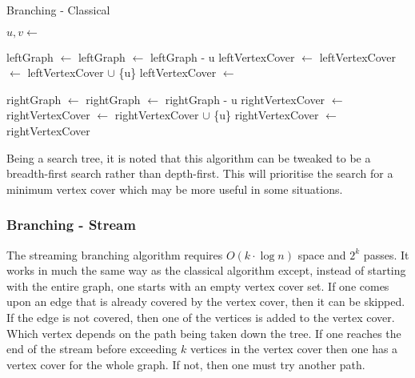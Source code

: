 \begin{algorithm}[htb]
    \caption{Branching - Classical}
    \label{alg:branching_classical}
    \DontPrintSemicolon

    \Func
    {
    }
    {
        $u, v \gets$ \;

        leftGraph $\gets$ \;
        leftGraph $\gets$ leftGraph - u\;
        leftVertexCover $\gets$ \;
        leftVertexCover $\gets$ leftVertexCover $\cup$ \{u\}\;
        leftVertexCover $\gets$ \;

        rightGraph $\gets$ \;
        rightGraph $\gets$ rightGraph - u\;
        rightVertexCover $\gets$ \;
        rightVertexCover $\gets$ rightVertexCover $\cup$ \{u\}\;
        rightVertexCover $\gets$ \;
        \Return rightVertexCover
    }
\end{algorithm}

Being a search tree, it is noted that this algorithm can be tweaked to be a
breadth-first search rather than depth-first. This will prioritise the search
for a minimum vertex cover which may be more useful in some situations.

\subsubsection{Branching - Stream}

The streaming branching algorithm requires \(O(k\cdot \log n)\) space and
\(2^k\) passes. It works in much the same way as the classical algorithm
except, instead of starting with the entire graph, one starts with an empty
vertex cover set. If one comes upon an edge that is already covered by the
vertex cover, then it can be skipped. If the edge is not covered, then one of
the vertices is added to the vertex cover. Which vertex depends on the path
being taken down the tree. If one reaches the end of the stream before
exceeding \(k\) vertices in the vertex cover then one has a vertex cover for
the whole graph. If not, then one must try another path.

